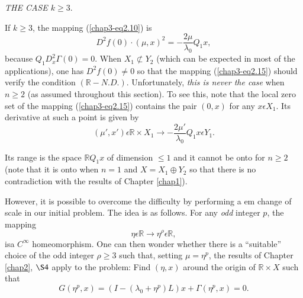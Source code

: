 \begin{center}
{\em THE CASE $k \geq 3$}.
\end{center}

If $k \geq 3$, the mapping (\ref{chap3-eq2.10}) is
\begin{equation*}
D^{2}f(0) \cdot (\mu, x)^{2} = -\frac{2\mu}{\lambda_{0}} Q_{1}x,\tag{2.15}\label{chap3-eq2.15}
\end{equation*}
because $Q_{1}D_{x}^{2}\Gamma(0) = 0$. When $X_{1} \nsubset Y_{2}$
(which can be expected in most of the applications), one has
$D^{2}f(0) \neq 0$ so that the mapping (\ref{chap3-eq2.15}) should
verify the condition $(\mathbb{R}-N.D.)$. Unfortunately, {\em this is
  never the case} when $n \geq 2$ (as assumed throughout this
section). To see this, note that the local zero set of the mapping
(\ref{chap3-eq2.15}) contains the pair $(0, x)$ for any $x \epsilon
X_{1}$. Its derivative at  such a point is given by
$$
(\mu', x') \epsilon \mathbb{R} \times X_{1} \to
-\frac{2\mu'}{\lambda_{0}} Q_{1}x \epsilon Y_{1}.
$$

Its range is the space $\mathbb{R}Q_{1}x$ of dimension $\leq 1$ and it
cannot be onto for $n \geq 2$ (note that it is onto when $n = 1$ and
$X = X_{1} \oplus Y_{2}$ so that there is no contradiction with the
results of Chapter \ref{chap1}).

However, it is possible to overcome the difficulty by performing a {em
change of scale} in our initial problem. The idea is as follows. For
any {\em odd} integer $p$, the mapping
$$
\eta \epsilon \mathbb{R} \to \eta^{\rho} \epsilon \mathbb{R},
$$
is\pageoriginale a $C^{\infty}$ homeomorphism. One can then wonder
whether there is a ``suitable'' choice of the odd integer $\rho \geq 3$
such that, setting $\mu = \eta^{p}$, the results of Chapter
\ref{chap2}, $\S 4$ apply to the problem: Find $(\eta, x)$ around the
origin of $\mathbb{R} \times X$ such that
\begin{equation*}
G(\eta^{p}, x) = (I - (\lambda_{0} + \eta^{p})L)x + \Gamma(\eta^{p},
x) = 0.\tag{2.16}\label{chap3-eq2.16}
\end{equation*}

